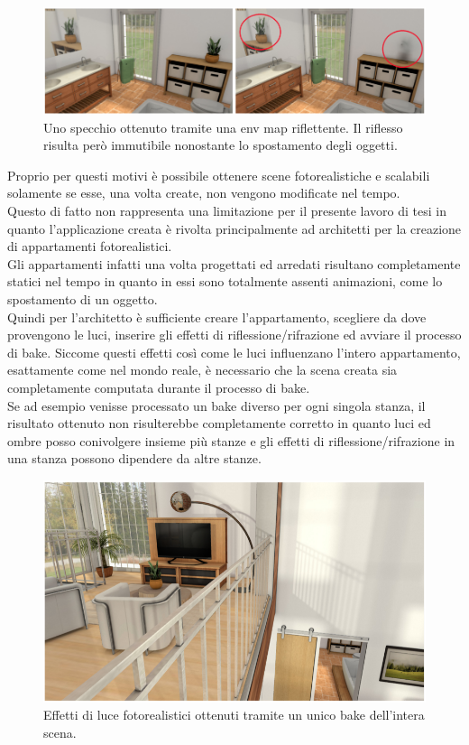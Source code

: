 \\
\begin{figure}[htb]
 \centering
 \includegraphics[width=1\linewidth]{images/chapter_lrl/lrl_appl2.png}\hfill
 \caption[Applicabilità, riflesso con env map]{Uno specchio ottenuto tramite una env map riflettente. Il riflesso risulta però immutibile nonostante lo spostamento degli oggetti.}
 \label{fig:lrl_appl2}
\end{figure}
Proprio per questi motivi è possibile ottenere scene fotorealistiche e scalabili solamente se esse, una volta create, non vengono modificate nel tempo.
\\
Questo di fatto non rappresenta una limitazione per il presente lavoro di tesi in quanto l’applicazione creata è rivolta principalmente ad architetti per la creazione di appartamenti fotorealistici.
\\
Gli appartamenti infatti una volta progettati ed arredati risultano completamente statici nel tempo in quanto in essi sono totalmente assenti animazioni, come lo spostamento di un oggetto.
\\
Quindi per l’architetto è sufficiente creare l’appartamento, scegliere da dove provengono le luci, inserire gli effetti di riflessione/rifrazione ed avviare il processo di bake.
Siccome questi effetti così come le luci influenzano l’intero appartamento, esattamente come nel mondo reale, è necessario che la scena creata sia completamente computata durante il processo di bake. 
\\
Se ad esempio venisse processato un bake diverso per ogni singola stanza, il risultato ottenuto non risulterebbe completamente corretto in quanto luci ed ombre posso conivolgere insieme più stanze e gli effetti di riflessione/rifrazione in una stanza possono dipendere da altre stanze.
\\
\begin{figure}[htb]
 \centering
 \includegraphics[width=1\linewidth]{images/chapter_lrl/lrl_appl3.png}\hfill
 \caption[Applicabilità, scene autocontenute]{Effetti di luce fotorealistici ottenuti tramite un unico bake dell'intera scena.}
 \label{fig:lrl_appl3}
\end{figure}
